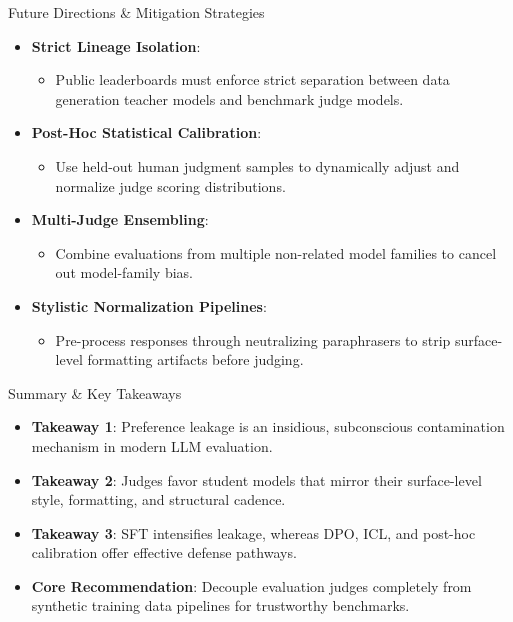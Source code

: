 \documentclass[10pt]{beamer}
\begin{document}
	
	\begin{frame}{Future Directions \& Mitigation Strategies}
		\begin{itemize}
			\item \textbf{Strict Lineage Isolation}:
			\begin{itemize}
				\item Public leaderboards must enforce strict separation between data generation teacher models and benchmark judge models.
			\end{itemize}
			\vspace{0.2cm}
			\item \textbf{Post-Hoc Statistical Calibration}:
			\begin{itemize}
				\item Use held-out human judgment samples to dynamically adjust and normalize judge scoring distributions.
			\end{itemize}
			\vspace{0.2cm}
			\item \textbf{Multi-Judge Ensembling}:
			\begin{itemize}
				\item Combine evaluations from multiple non-related model families to cancel out model-family bias.
			\end{itemize}
			\vspace{0.2cm}
			\item \textbf{Stylistic Normalization Pipelines}:
			\begin{itemize}
				\item Pre-process responses through neutralizing paraphrasers to strip surface-level formatting artifacts before judging.
			\end{itemize}
		\end{itemize}
	\end{frame}
	
	\begin{frame}{Summary \& Key Takeaways}
		\begin{itemize}
			\item \textbf{Takeaway 1}: Preference leakage is an insidious, subconscious contamination mechanism in modern LLM evaluation.
			\vspace{0.25cm}
			\item \textbf{Takeaway 2}: Judges favor student models that mirror their surface-level style, formatting, and structural cadence.
			\vspace{0.25cm}
			\item \textbf{Takeaway 3}: SFT intensifies leakage, whereas DPO, ICL, and post-hoc calibration offer effective defense pathways.
			\vspace{0.25cm}
			\item \textbf{Core Recommendation}: Decouple evaluation judges completely from synthetic training data pipelines for trustworthy benchmarks.
		\end{itemize}
	\end{frame}
	
\end{document}
